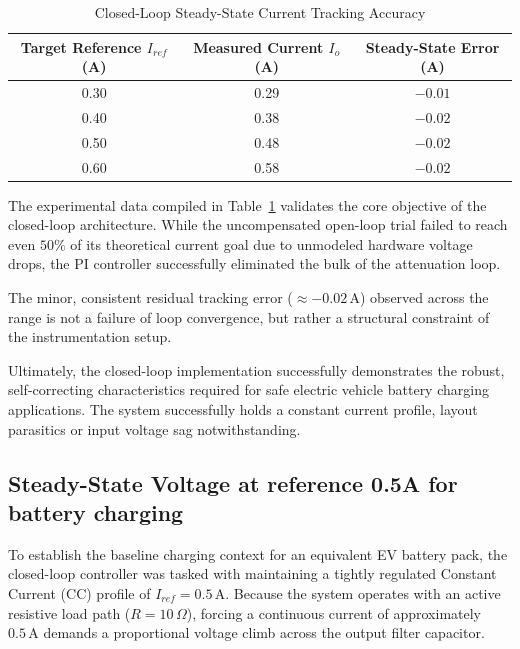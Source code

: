 \documentclass[12pt,a4paper]{article}
\begin{document}
\begin{table}[h!]
\centering
\caption{Closed-Loop Steady-State Current Tracking Accuracy}
\label{tab:closed_loop_results}
\begin{tabular}{ccc}
\toprule
\textbf{Target Reference $I_{ref}$ (A)} & \textbf{Measured Current $I_o$ (A)} & \textbf{Steady-State Error (A)} \\ \midrule
0.30                                    & 0.29                                & $-0.01$                         \\ 
0.40                                    & 0.38                                & $-0.02$                         \\ 
0.50                                    & 0.48                                & $-0.02$                         \\ 
0.60                                    & 0.58                                & $-0.02$                         \\ \bottomrule
\end{tabular}
\end{table}

The experimental data compiled in Table~\ref{tab:closed_loop_results} validates the core objective of the closed-loop architecture. While the uncompensated open-loop trial failed to reach even $50\%$ of its theoretical current goal due to unmodeled hardware voltage drops, the PI controller successfully eliminated the bulk of the attenuation loop.

The minor, consistent residual tracking error ($\approx -0.02\,\text{A}$) observed across the range is not a failure of loop convergence, but rather a structural constraint of the instrumentation setup.

Ultimately, the closed-loop implementation successfully demonstrates the robust, self-correcting characteristics required for safe electric vehicle battery charging applications. The system successfully holds a constant current profile, layout parasitics or input voltage sag notwithstanding.

\subsection{Steady-State Voltage at reference 0.5A for battery charging}
To establish the baseline charging context for an equivalent EV battery pack, the closed-loop controller was tasked with maintaining a tightly regulated Constant Current (CC) profile of $I_{ref} = 0.5\,\text{A}$. Because the system operates with an active resistive load path ($R = 10\,\Omega$), forcing a continuous current of approximately $0.5\,\text{A}$ demands a proportional voltage climb across the output filter capacitor.
\end{document}
